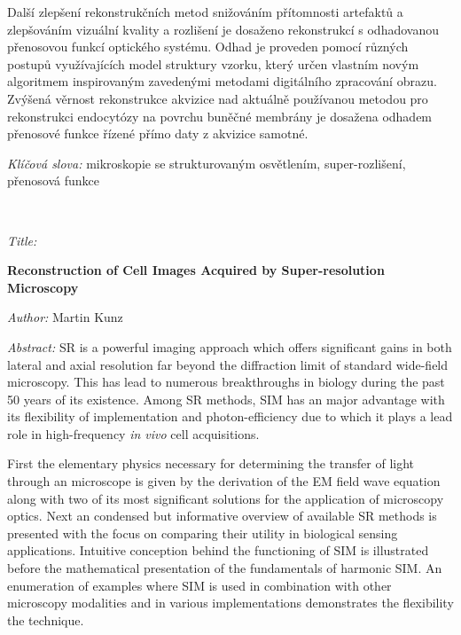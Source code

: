 Další zlepšení rekonstrukčních metod snižováním přítomnosti artefaktů a zlepšováním vizuální kvality a rozlišení je 
    dosaženo rekonstrukcí s odhadovanou přenosovou funkcí optického systému.
Odhad je proveden pomocí různých postupů využívajících model struktury vzorku, který určen vlastním novým algoritmem
    inspirovaným zavedenými metodami digitálního zpracování obrazu.
Zvýšená věrnost rekonstrukce akvizice nad aktuálně používanou metodou pro rekonstrukci endocytózy na povrchu buněčné 
    membrány je dosažena odhadem přenosové funkce řízené přímo daty z akvizice samotné.

\bigskip{}

\noindent \emph{Klíčová slova:} mikroskopie se strukturovaným osvětlením, super-rozlišení, přenosová funkce 

%
\vfill{}
~

\pagebreak
\begin{onehalfspace}
\noindent \emph{Title:}

\noindent \textbf{%
Reconstruction of Cell Images Acquired by Super-resolution Microscopy
}
\end{onehalfspace}

\bigskip{}

\noindent \emph{Author:} Martin Kunz

\bigskip{}

\noindent \emph{Abstract:} 
\Acf{SR} is a powerful imaging approach which offers significant gains in both lateral and axial
    resolution far beyond the diffraction limit of standard wide-field microscopy.
This has lead to numerous breakthroughs in biology during the past 50 years of its existence.
Among \ac{SR} methods, \acf{SIM} has an major advantage with its flexibility of implementation and photon-efficiency due 
    to which it plays a lead role in high-frequency \emph{in vivo} cell acquisitions.

First the elementary physics necessary for determining the transfer of light through an microscope is given by the 
    derivation of the \acf{EM} field wave equation along with two of its most significant solutions for the application 
    of microscopy optics.
Next an condensed but informative overview of available \ac{SR} methods is presented with the focus on comparing their
    utility in biological sensing applications.
Intuitive conception behind the functioning of \ac{SIM} is illustrated before the mathematical presentation of the 
    fundamentals of harmonic \ac{SIM}.
An enumeration of examples where \ac{SIM} is used in combination with other microscopy modalities and in various
    implementations demonstrates the flexibility the technique.


